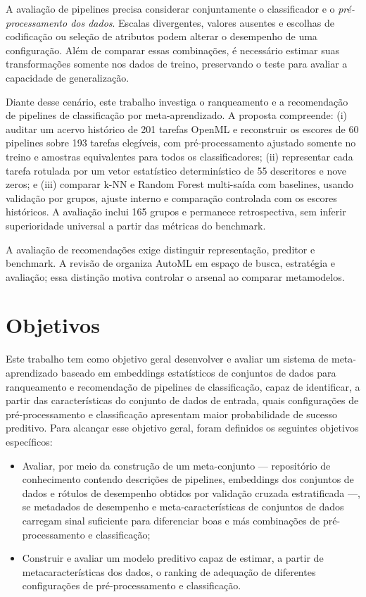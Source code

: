 A avaliação de pipelines precisa considerar conjuntamente o classificador e o \textit{pré-processamento dos dados}. Escalas divergentes, valores ausentes e escolhas de codificação ou seleção de atributos podem alterar o desempenho de uma configuração. Além de comparar essas combinações, é necessário estimar suas transformações somente nos dados de treino, preservando o teste para avaliar a capacidade de generalização.

Diante desse cenário, este trabalho investiga o ranqueamento e a recomendação de pipelines de classificação por meta-aprendizado. A proposta compreende: (i) auditar um acervo histórico de 201 tarefas OpenML e reconstruir os escores de 60 pipelines sobre 193 tarefas elegíveis, com pré-processamento ajustado somente no treino e amostras equivalentes para todos os classificadores; (ii) representar cada tarefa rotulada por um vetor estatístico determinístico de 55 descritores e nove zeros; e (iii) comparar k-NN e Random Forest multi-saída com baselines, usando validação por grupos, ajuste interno e comparação controlada com os escores históricos. A avaliação inclui 165 grupos e permanece retrospectiva, sem inferir superioridade universal a partir das métricas do benchmark.

A avaliação de recomendações exige distinguir representação, preditor e benchmark. A revisão de  organiza AutoML em espaço de busca, estratégia e avaliação; essa distinção motiva controlar o arsenal ao comparar metamodelos.

\section{Objetivos}\label{sec:objetivos}

Este trabalho tem como objetivo geral desenvolver e avaliar um sistema de meta-aprendizado baseado em embeddings estatísticos de conjuntos de dados para ranqueamento e recomendação de pipelines de classificação, capaz de identificar, a partir das características do conjunto de dados de entrada, quais configurações de pré-processamento e classificação apresentam maior probabilidade de sucesso preditivo. Para alcançar esse objetivo geral, foram definidos os seguintes objetivos específicos:

\begin{itemize}
    \item Avaliar, por meio da construção de um meta-conjunto — repositório de conhecimento contendo descrições de pipelines, embeddings dos conjuntos de dados e rótulos de desempenho obtidos por validação cruzada estratificada —, se metadados de desempenho e meta-características de conjuntos de dados carregam sinal suficiente para diferenciar boas e más combinações de pré-processamento e classificação;
    \item Construir e avaliar um modelo preditivo capaz de estimar, a partir de metacaracterísticas dos dados, o ranking de adequação de diferentes configurações de pré-processamento e classificação.
\end{itemize}

